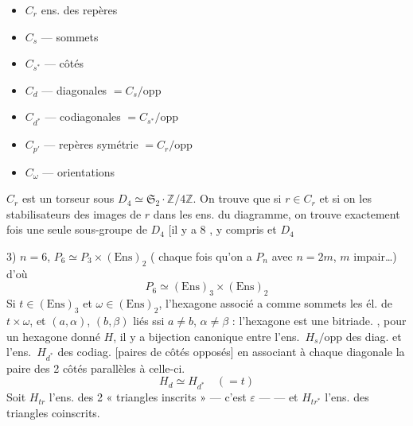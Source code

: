 \documentclass[11pt,a4paper]{article}
\begin{document}

\begin{itemize}
  \item $C_r$ ens. des repères
  \item $C_s$ — sommets
  \item $C_{s^*}$ — côtés
  \item $C_d$ — diagonales $= C_s/\mathrm{opp}$
  \item $C_{d^*}$ — codiagonales $= C_{s^*}/\mathrm{opp}$
  \item $C_{p'}$ — repères  symétrie $= C_r/\mathrm{opp}$
  \item $C_\omega$ — orientations
\end{itemize}

$C_r$ est un torseur sous $D_4 \simeq \mathfrak{S}_2 \cdot \mathbb{Z}/4\mathbb{Z}$. On trouve que si $r \in C_r$ et si on  les stabilisateurs des images de $r$ dans les ens. du diagramme, on trouve exactement \ill{} fois \ill{} une seule  \ill{} sous-groupe de $D_4$ [il y a  8 , y compris \ill{} et $D_4$


3) $n = 6$, \quad $P_6 \simeq P_3 \times (\mathrm{Ens})_2$ ( chaque fois qu'on a $P_n$ avec $n = 2m$, $m$ impair…) d'où
\[
  P_6 \simeq (\mathrm{Ens})_3 \times (\mathrm{Ens})_2
\]
Si $t \in (\mathrm{Ens})_3$ et $\omega \in (\mathrm{Ens})_2$, \struck{\ill{}} l'hexagone associé a comme sommets les él. de $t \times \omega$, et $(a,\alpha)$, $(b,\beta)$ \struck{\ill{}} liés ssi $a \neq b$, $\alpha \neq \beta$ : l'hexagone est une bitriade. , pour un hexagone donné $H$,  il y a bijection canonique entre l'ens.\ $H_s/\mathrm{opp}$ \struck{\ill{}} des diag. et l'ens.\ $H_{d^*}$ des \struck{\ill{}} codiag. [paires de côtés opposés] en associant à chaque diagonale la paire des 2 côtés parallèles à celle-ci.
\[
  \boxed{H_d \simeq H_{d^*}} \quad (= t)
\]
Soit $H_{tr}$ l'ens. des 2 « triangles inscrits » — c'est $\varepsilon$ —  — \ill{} et $H_{tr^*}$ l'ens. des triangles coinscrits.
\end{document}

